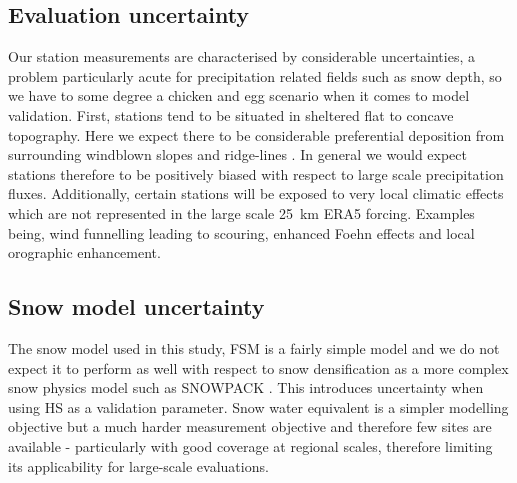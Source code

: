 \documentclass[hess, manuscript]{copernicus}
\begin{document}
\subsection{Evaluation uncertainty}
Our station measurements are characterised by considerable uncertainties, a problem particularly acute for precipitation related fields such as snow depth, so we have to some degree a chicken and egg scenario when it comes to model validation. First, stations tend to be situated in sheltered flat to concave topography. Here we expect there to be considerable preferential deposition from surrounding windblown slopes and ridge-lines \citep{Grunewald2015-qm}. In general we would expect stations therefore to be positively biased with respect to large scale precipitation fluxes. Additionally, certain stations will be exposed to very local climatic effects which are not represented in the large scale 25~km ERA5 forcing. Examples being, wind funnelling leading to scouring, enhanced Foehn effects and local orographic enhancement. 


\subsection{Snow model uncertainty}
The snow model used in this study, FSM is a fairly simple model and we do not expect it to perform as well with respect to snow densification as a more complex snow physics model such as SNOWPACK \citep{Bartelt2002-lu}. This introduces uncertainty when using HS as a validation parameter. Snow water equivalent is a simpler modelling objective but a much harder measurement objective and therefore few sites are available - particularly with good coverage at regional scales, therefore limiting its applicability for large-scale evaluations.


\end{document}

